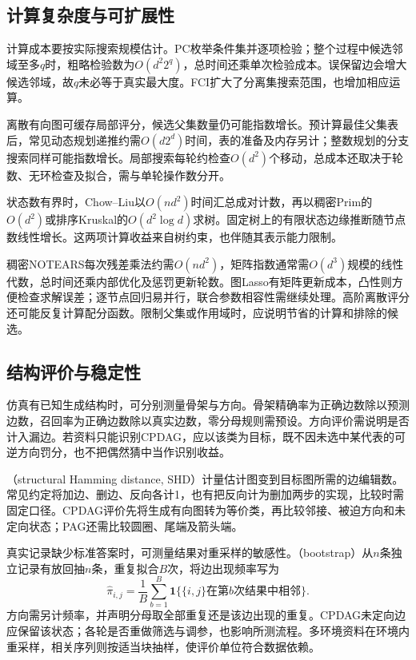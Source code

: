 \subsection{计算复杂度与可扩展性}
\label{sec:pgm-structure-learning-complexity}

计算成本要按实际搜索规模估计。PC枚举条件集并逐项检验；整个过程中候选邻域至多$q$时，粗略检验数为$O(d^2 2^q)$，总时间还乘单次检验成本。误保留边会增大候选邻域，故$q$未必等于真实最大度。FCI扩大了分离集搜索范围，也增加相应运算。

离散有向图可缓存局部评分，候选父集数量仍可能指数增长。预计算最佳父集表后，常见动态规划递推约需$O(d2^d)$时间，表的准备及内存另计；整数规划的分支搜索同样可能指数增长。局部搜索每轮约检查$O(d^2)$个移动，总成本还取决于轮数、无环检查及拟合，需与单轮操作数分开。

状态数有界时，Chow--Liu以$O(nd^2)$时间汇总成对计数，再以稠密Prim的$O(d^2)$或排序Kruskal的$O(d^2\log d)$求树。固定树上的有限状态边缘推断随节点数线性增长。这两项计算收益来自树约束，也伴随其表示能力限制。

稠密NOTEARS每次残差乘法约需$O(nd^2)$，矩阵指数通常需$O(d^3)$规模的线性代数，总时间还乘内部优化及惩罚更新轮数。图Lasso有矩阵更新成本，凸性则方便检查求解误差；逐节点回归易并行，联合参数相容性需继续处理。高阶离散评分还可能反复计算配分函数。限制父集或作用域时，应说明节省的计算和排除的候选。

\subsection{结构评价与稳定性}
\label{sec:pgm-structure-learning-evaluation}

仿真有已知生成结构时，可分别测量骨架与方向。骨架精确率为正确边数除以预测边数，召回率为正确边数除以真实边数，零分母规则需预设。方向评价需说明是否计入漏边。若资料只能识别CPDAG，应以该类为目标，既不因未选中某代表的可逆方向罚分，也不把偶然猜中当作识别收益。

（structural Hamming distance, SHD）计量估计图变到目标图所需的边编辑数。常见约定将加边、删边、反向各计1，也有把反向计为删加两步的实现，比较时需固定口径。CPDAG评价先将生成有向图转为等价类，再比较邻接、被迫方向和未定向状态；PAG还需比较圆圈、尾端及箭头端。

真实记录缺少标准答案时，可测量结果对重采样的敏感性。（bootstrap）从$n$条独立记录有放回抽$n$条，重复拟合$B$次，将边出现频率写为
\[
  \widehat\pi_{i,j}
  =\frac1B\sum_{b=1}^{B}
       \mathbf{1}\{\{i,j\}\text{在第}b\text{次结果中相邻}\}.
\]
方向需另计频率，并声明分母取全部重复还是该边出现的重复。CPDAG未定向边应保留该状态；各轮是否重做筛选与调参，也影响所测流程。多环境资料在环境内重采样，相关序列则按适当块抽样，使评价单位符合数据依赖。

